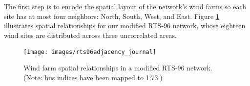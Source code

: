 \documentclass[conference]{IEEEtran}
\begin{document}
The first step is to encode the spatial layout of the network's wind farms so each site has at most four neighbors: North, South, West, and East. Figure \ref{fig:rts96adjacency_journal} illustrates spatial relationships for our modified RTS-96 network, whose eighteen wind sites are distributed across three uncorrelated areas.
\begin{figure}[h]
\centering
\texttt{[image: images/rts96adjacency\_journal]}
\caption{Wind farm spatial relationships in a modified RTS-96 network. (Note: bus indices have been mapped to 1:73.)}
\label{fig:rts96adjacency_journal}
\end{figure}
\end{document}
